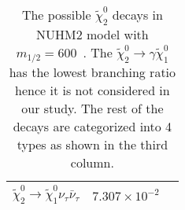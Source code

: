 \begin{table}[htbp]
\begin{center}
{\begin{tabular}{lll}
                $\widetilde{\chi}_{2}^{0} \to \widetilde{\chi}_{1}^{0} \nu_{\tau} \bar{\nu}_{\tau}$ & $7.307\times 10^{-2}$ & \\
                \hline
                \hline
            \end{tabular}
        }
    \end{center}
    \caption{The possible $\widetilde{\chi}^{0}_{2}$ decays in NUHM2 model with $m_{1/2}=600$~{\GeV}.
    The $\widetilde{\chi}_{2}^{0} \to \gamma \widetilde{\chi}^{0}_{1}$ has the lowest branching ratio hence it is not considered in our study.
    The rest of the decays are categorized into 4 types as shown in the third column.}
    \label{tab:data_NUHM2_n2_decays}
\end{table}%
